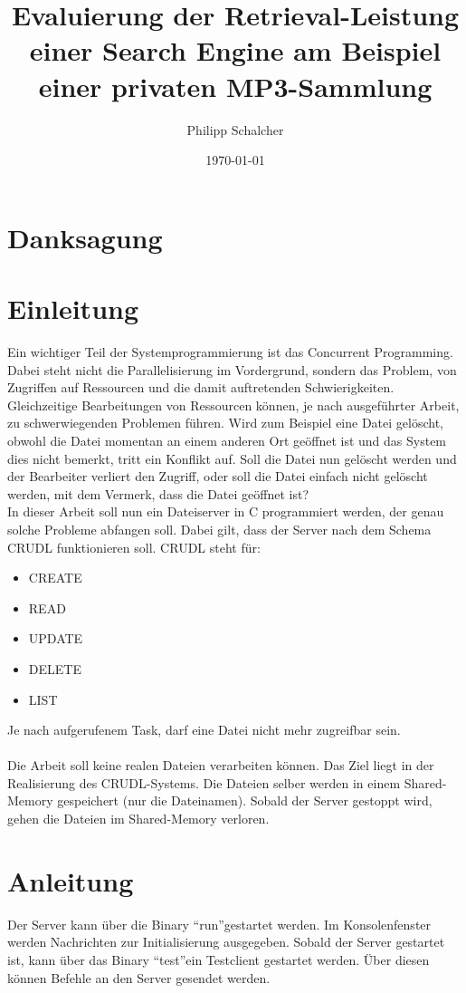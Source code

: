 \documentclass[12pt,a4paper,ngerman]{report}
\author{Philipp Schalcher}
\title{Evaluierung der Retrieval-Leistung einer Search Engine am Beispiel einer privaten MP3-Sammlung}
\date{\today}
\begin{document}

\chapter*{Danksagung}
\tableofcontents
\begin{abstract}

\end{abstract}
\chapter*{Einleitung}
Ein wichtiger Teil der Systemprogrammierung ist das Concurrent Programming. Dabei steht nicht die Parallelisierung im Vordergrund, sondern das Problem, von Zugriffen auf Ressourcen und die damit auftretenden Schwierigkeiten. Gleichzeitige Bearbeitungen von Ressourcen können, je nach ausgeführter Arbeit, zu schwerwiegenden Problemen führen. Wird zum Beispiel eine Datei gelöscht, obwohl die Datei momentan an einem anderen Ort geöffnet ist und das System dies nicht bemerkt, tritt ein Konflikt auf. Soll die Datei nun gelöscht werden und der Bearbeiter verliert den Zugriff, oder soll die Datei einfach nicht gelöscht werden, mit dem Vermerk, dass die Datei geöffnet ist?
\\
In dieser Arbeit soll nun ein Dateiserver in C programmiert werden, der genau solche Probleme abfangen soll. Dabei gilt, dass der Server nach dem Schema CRUDL funktionieren soll. CRUDL steht für:
\begin{itemize}
	\item CREATE
	\item READ
	\item UPDATE
	\item DELETE
	\item LIST
\end{itemize}
Je nach aufgerufenem Task, darf eine Datei nicht mehr zugreifbar sein.
\\
\\
Die Arbeit soll keine realen Dateien verarbeiten können. Das Ziel liegt in der Realisierung des CRUDL-Systems. Die Dateien selber werden in einem Shared-Memory gespeichert (nur die Dateinamen). Sobald der Server gestoppt wird, gehen die Dateien im Shared-Memory verloren.
\chapter{Anleitung}
Der Server kann über die Binary \textquotedblleft run\textquotedblright gestartet werden. Im Konsolenfenster werden Nachrichten zur Initialisierung ausgegeben. Sobald der Server gestartet ist, kann über das Binary \textquotedblleft test\textquotedblright ein Testclient gestartet werden. Über diesen können Befehle an den Server gesendet werden.
\end{document}
